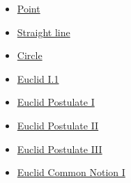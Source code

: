 \begin{dependencies}
\begin{itemize}
  \item \hyperref[def:euclid-point]{Point}
  \item \hyperref[def:euclid-straight-line]{Straight line}
  \item \hyperref[def:euclid-circle]{Circle}
  \item \hyperref[thm:euclid-i-1]{Euclid I.1}
  \item \hyperref[ax:euclid-postulate-draw-straight-line]{Euclid Postulate I}
  \item \hyperref[ax:euclid-postulate-produce-straight-line]{Euclid Postulate II}
  \item \hyperref[ax:euclid-postulate-describe-circle]{Euclid Postulate III}
  \item \hyperref[ax:euclid-common-notion-things-equal-to-same]{Euclid Common Notion I}
\end{itemize}
\end{dependencies}

\clearpage
